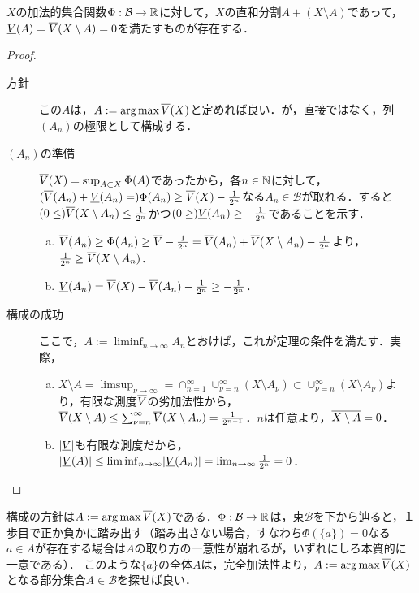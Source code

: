 \documentclass[uplatex, dvipdfmx]{jsreport}
\renewcommand{\B}{\mathcal{B}}
\begin{document}
\begin{theorem}\label{thm-Hahn-decomposition-theorem}
    $X$の加法的集合関数$\Phi:\B\to\R$に対して，$X$の直和分割$A+(X\setminus A)$であって，$\underline{V}(A)=\overline{V}(X\setminus A)=0$を満たすものが存在する．
\end{theorem}
\begin{proof}\mbox{}
    \begin{description}
        \item[方針] この$A$は，$A:=\operatorname*{arg\,max}\overline{V}(X)$と定めれば良い．が，直接ではなく，列$(A_n)$の極限として構成する．
        \item[$(A_n)$の準備] $\overline{V}(X)=\sup_{A\subset X}\Phi(A)$であったから，各$n\in\mathbb{N}$に対して，$(\overline{V}(A_n)+\underline{V}(A_n)=)\Phi(A_n)\ge\overline{V}(X)-\frac{1}{2^n}$なる$A_n\in\B$が取れる．すると$(0\le)\overline{V}(X\setminus A_n)\le\frac{1}{2^n}$かつ$(0\ge)\underline{V}(A_n)\ge-\frac{1}{2^n}$であることを示す．
        \begin{enumerate}[(a)]
            \item $\overline{V}(A_n)\ge\Phi(A_n)\ge\overline{V}-\frac{1}{2^n}=\overline{V}(A_n)+\overline{V}(X\setminus A_n)-\frac{1}{2^n}$より，$\frac{1}{2^n}\ge\overline{V}(X\setminus A_n)$．
            \item $\underline{V}(A_n)=\overline{V}(X)-\overline{V}(A_n)-\frac{1}{2^n}\ge-\frac{1}{2^n}$．
        \end{enumerate}
        \item[構成の成功] ここで，$A:=\liminf_{n\to\infty}A_n$とおけば，これが定理の条件を満たす．実際，
        \begin{enumerate}[(a)]
            \item $X\setminus A=\limsup_{\nu\to\infty}=\cap^\infty_{n=1}\cup_{\nu=n}^\infty (X\setminus A_\nu)\subset\cup^\infty_{\nu=n}(X\setminus A_\nu)$より，有限な測度$\overline{V}$の劣加法性から，$\overline{V}(X\setminus A)\le\sum^\infty_{\nu=n}\overline{V}(X\setminus A_\nu)=\frac{1}{2^{n-1}}$．$n$は任意より，$\overline{X\setminus A}=0$．
            \item $\lvert\underline{V}\rvert$も有限な測度だから，$\lvert\underline{V}(A)\rvert\le\liminf_{n\to\infty}\lvert\underline{V}(A_n)\rvert=\lim_{n\to\infty}\frac{1}{2^n}=0$．
        \end{enumerate}
    \end{description}
\end{proof}
\begin{remarks}
    構成の方針は$A:=\operatorname*{arg\,max}\overline{V}(X)$である．$\Phi:\B\to\R$は，束$\B$を下から辿ると，１歩目で正か負かに踏み出す（踏み出さない場合，すなわち$\Phi(\{a\})=0$なる$a\in A$が存在する場合は$A$の取り方の一意性が崩れるが，いずれにしろ本質的に一意である）．
    このような$\{a\}$の全体$A$は，完全加法性より，$A:=\operatorname*{arg\,max}\overline{V}(X)$となる部分集合$A\in\B$を探せば良い．
\end{remarks}
\end{document}
